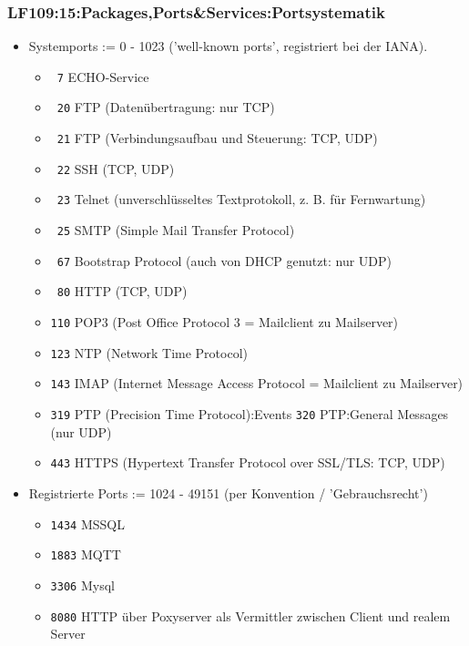 \begin{frame}  
  \frametitle{LF109:15:Packages,Ports\&Services:Portsystematik}

    \begin{itemize}
    \item \tiny{Systemports := 0 - 1023 ('well-known ports', registriert bei der IANA)}.
      \begin{itemize}
        \item \tiny{\texttt{  7} ECHO-Service} 
        \item \tiny{\texttt{ 20} FTP (Datenübertragung: nur TCP)} 
        \item \tiny{\texttt{ 21} FTP (Verbindungsaufbau und Steuerung: TCP, UDP)}
        \item \tiny{\texttt{ 22} SSH (TCP, UDP)}
        \item \tiny{\texttt{ 23} Telnet (unverschlüsseltes Textprotokoll, z. B. für Fernwartung)}
        \item \tiny{\texttt{ 25} SMTP (Simple Mail Transfer Protocol)}
        \item \tiny{\texttt{ 67} Bootstrap Protocol (auch von DHCP genutzt: nur UDP)}
        \item \tiny{\texttt{ 80} HTTP (TCP, UDP)}
        \item \tiny{\texttt{110} POP3 (Post Office Protocol 3 = Mailclient zu Mailserver)}
        \item \tiny{\texttt{123} NTP (Network Time Protocol)}
        \item \tiny{\texttt{143} IMAP (Internet Message Access Protocol = Mailclient zu Mailserver)}
        \item \tiny{\texttt{319} PTP (Precision Time Protocol):Events  \texttt{320} PTP:General Messages (nur UDP)}
        \item \tiny{\texttt{443} HTTPS (Hypertext Transfer Protocol over SSL/TLS: TCP, UDP)}
      \end{itemize}
    \item \tiny{Registrierte Ports := 1024 - 49151 (per Konvention / 'Gebrauchsrecht')}
      \begin{itemize}
        \item \tiny{\texttt{1434} MSSQL}
        \item \tiny{\texttt{1883} MQTT}
        \item \tiny{\texttt{3306} Mysql}
      \item \tiny{\texttt{8080} HTTP über Poxyserver als Vermittler zwischen Client und realem Server}
      \end{itemize}
    \end{itemize}

\end{frame}

